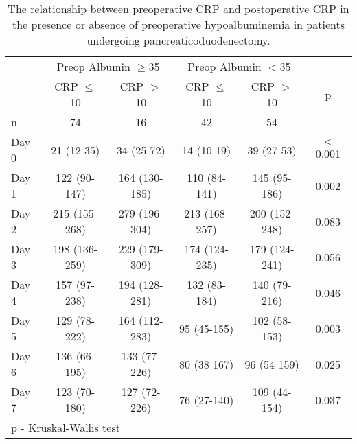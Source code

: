 
\begin{table}[p]
	\caption{The relationship  between preoperative CRP and postoperative CRP in the presence or absence of preoperative hypoalbuminemia in patients undergoing pancreaticoduodenectomy. }
	\label{table:sirs_crp_with_alb}
	\centering
	\renewcommand{\arraystretch}{1.4} %
	
	\begin{tabular}{|l c c c c c|}
		\hline
		      & \multicolumn{2}{c}{Preop Albumin $\geq$35} & \multicolumn{2}{c}{Preop Albumin $<$35} &  \\
		      & CRP $\leq$ 10 & CRP $>$ 10                 & CRP $\leq$ 10 & CRP $>$ 10              & p        \\
		n     & 74            & 16                         & 42            & 54                      &  \\ \hline
		Day 0 & 21 (12-35)    & 34 (25-72)                 & 14 (10-19)    & 39 (27-53)              & $<$0.001 \\
		Day 1 & 122 (90-147)  & 164 (130-185)              & 110 (84-141)  & 145 (95-186)            & 0.002    \\
		Day 2 & 215 (155-268) & 279 (196-304)              & 213 (168-257) & 200 (152-248)           & 0.083    \\
		Day 3 & 198 (136-259) & 229 (179-309)              & 174 (124-235) & 179 (124-241)           & 0.056    \\
		Day 4 & 157 (97-238)  & 194 (128-281)              & 132 (83-184)  & 140 (79-216)            & 0.046    \\
		Day 5 & 129 (78-222)  & 164 (112-283)              & 95 (45-155)   & 102 (58-153)            & 0.003    \\
		Day 6 & 136 (66-195)  & 133 (77-226)               & 80 (38-167)   & 96 (54-159)             & 0.025    \\
		Day 7 & 123 (70-180)  & 127 (72-226)               & 76 (27-140)   & 109 (44-154)            & 0.037    \\ \hline
		\multicolumn{6}{l}{p - Kruskal-Wallis test}
	\end{tabular}	
\end{table}